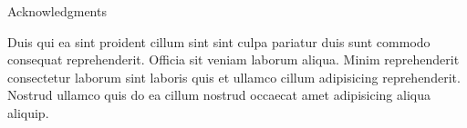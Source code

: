 \thispagestyle{empty}

\vspace*{20mm}

\begin{center}
    { Acknowledgments}
\end{center}

\vspace{10mm}

Duis qui ea sint proident cillum sint sint culpa pariatur duis sunt commodo consequat reprehenderit. Officia sit veniam laborum aliqua. Minim reprehenderit consectetur laborum sint laboris quis et ullamco cillum adipisicing reprehenderit. Nostrud ullamco quis do ea cillum nostrud occaecat amet adipisicing aliqua aliquip.

\cleardoublepage{}
